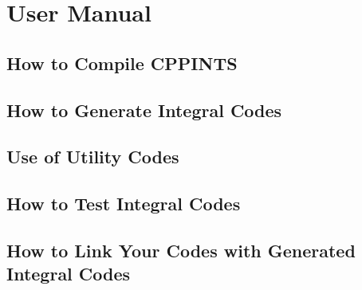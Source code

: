 %
% 
%
\chapter{User Manual}

\section{How to Compile CPPINTS}

\section{How to Generate Integral Codes}

\section{Use of Utility Codes}

\section{How to Test Integral Codes}

\section{How to Link Your Codes with Generated Integral Codes}
